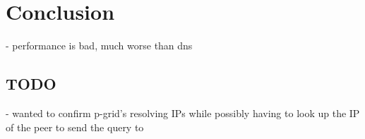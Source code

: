 \chapter{Conclusion}
\label{chap:conclusion}
- performance is bad, much worse than dns
\section{TODO}
- wanted to confirm p-grid's resolving IPs while possibly having to look up the
  IP of the peer to send the query to
